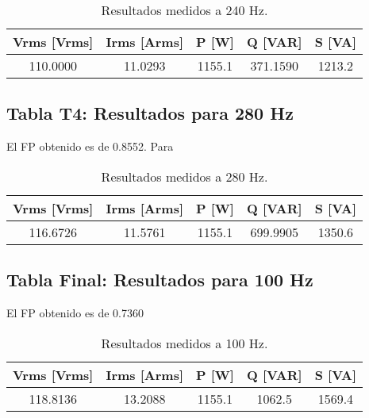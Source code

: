 \begin{table}[h!]
    \centering
    \begin{tabular}{@{}ccccc@{}}
        \toprule
        Vrms [Vrms] & Irms [Arms] & P [W] & Q [VAR] & S [VA] \\ \midrule
        110.0000 & 11.0293 & 1155.1 & 371.1590 & 1213.2 \\ 
        \bottomrule
    \end{tabular}
    \caption{Resultados medidos a 240 Hz.}
\end{table}

\subsection*{Tabla T4: Resultados para 280 Hz}
El FP obtenido es de 0.8552. Para
\begin{table}[h!]
    \centering
    \begin{tabular}{@{}ccccc@{}}
        \toprule
        Vrms [Vrms] & Irms [Arms] & P [W] & Q [VAR] & S [VA] \\ \midrule
        116.6726 & 11.5761 & 1155.1 & 699.9905 & 1350.6  \\ 
        \bottomrule
    \end{tabular}
    \caption{Resultados medidos a 280 Hz.}
\end{table}

\subsection*{Tabla Final: Resultados para 100 Hz}
El FP obtenido es de 0.7360
\begin{table}[h!]
    \centering
    \begin{tabular}{@{}ccccc@{}}
        \toprule
        Vrms [Vrms] & Irms [Arms] & P [W] & Q [VAR] & S [VA] \\ \midrule
        118.8136 & 13.2088 & 1155.1 & 1062.5 & 1569.4 \\ 
        \bottomrule
    \end{tabular}
    \caption{Resultados medidos a 100 Hz.}
\end{table}
